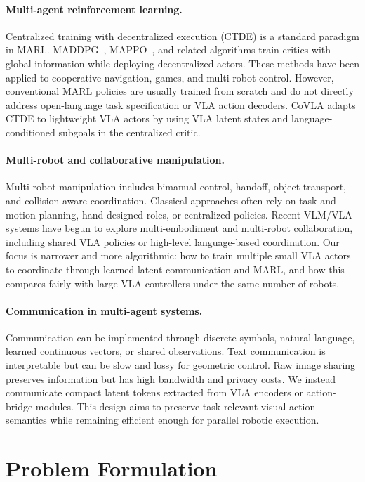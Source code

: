 \documentclass[11pt]{article}
\newcommand{\method}{CoVLA}
\begin{document}
\paragraph{Multi-agent reinforcement learning.}
Centralized training with decentralized execution (CTDE) is a standard paradigm in MARL. MADDPG~\citep{lowe2017maddpg}, MAPPO~\citep{yu2022mappo}, and related algorithms train critics with global information while deploying decentralized actors. These methods have been applied to cooperative navigation, games, and multi-robot control. However, conventional MARL policies are usually trained from scratch and do not directly address open-language task specification or VLA action decoders. \method{} adapts CTDE to lightweight VLA actors by using VLA latent states and language-conditioned subgoals in the centralized critic.

\paragraph{Multi-robot and collaborative manipulation.}
Multi-robot manipulation includes bimanual control, handoff, object transport, and collision-aware coordination. Classical approaches often rely on task-and-motion planning, hand-designed roles, or centralized policies. Recent VLM/VLA systems have begun to explore multi-embodiment and multi-robot collaboration, including shared VLA policies or high-level language-based coordination. Our focus is narrower and more algorithmic: how to train multiple small VLA actors to coordinate through learned latent communication and MARL, and how this compares fairly with large VLA controllers under the same number of robots.

\paragraph{Communication in multi-agent systems.}
Communication can be implemented through discrete symbols, natural language, learned continuous vectors, or shared observations. Text communication is interpretable but can be slow and lossy for geometric control. Raw image sharing preserves information but has high bandwidth and privacy costs. We instead communicate compact latent tokens extracted from VLA encoders or action-bridge modules. This design aims to preserve task-relevant visual-action semantics while remaining efficient enough for parallel robotic execution.

\section{Problem Formulation}
\end{document}
